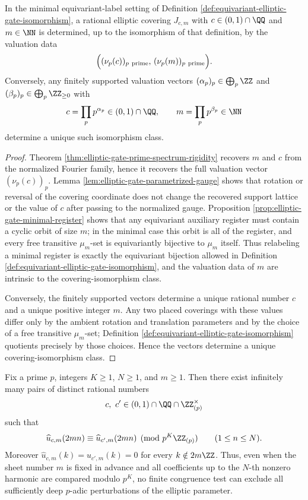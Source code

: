 \begin{corollary}\label{cor:elliptic-gate-prime-spectrum-classification}
In the minimal equivariant-label setting of Definition \ref{def:equivariant-elliptic-gate-isomorphism}, a rational elliptic covering \(J_{c,m}\) with \(c\in(0,1)\cap\QQ\) and \(m\in\NN\) is determined, up to the isomorphism of that definition, by the valuation data
\[
\Bigl((\nu_p(c))_{p\ \mathrm{prime}},\,(\nu_p(m))_{p\ \mathrm{prime}}\Bigr).
\]
Conversely, any finitely supported valuation vectors \((\alpha_p)_p\in\bigoplus_p\ZZ\) and \((\beta_p)_p\in\bigoplus_p\ZZ_{\ge0}\) with
\[
c=\prod_p p^{\alpha_p}\in(0,1)\cap\QQ,
\qquad
m=\prod_p p^{\beta_p}\in\NN
\]
determine a unique such isomorphism class.
\end{corollary}

\begin{proof}
Theorem \ref{thm:elliptic-gate-prime-spectrum-rigidity} recovers \(m\) and \(c\) from the normalized Fourier family, hence it recovers the full valuation vector \((\nu_p(c))_p\). Lemma \ref{lem:elliptic-gate-parametrized-gauge} shows that rotation or reversal of the covering coordinate does not change the recovered support lattice or the value of \(c\) after passing to the normalized gauge. Proposition \ref{prop:elliptic-gate-minimal-register} shows that any equivariant auxiliary register must contain a cyclic orbit of size \(m\); in the minimal case this orbit is all of the register, and every free transitive \(\mu_m\)-set is equivariantly bijective to \(\mu_m\) itself. Thus relabeling a minimal register is exactly the equivariant bijection allowed in Definition \ref{def:equivariant-elliptic-gate-isomorphism}, and the valuation data of \(m\) are intrinsic to the covering-isomorphism class.

Conversely, the finitely supported vectors determine a unique rational number \(c\) and a unique positive integer \(m\). Any two placed coverings with these values differ only by the ambient rotation and translation parameters and by the choice of a free transitive \(\mu_m\)-set; Definition \ref{def:equivariant-elliptic-gate-isomorphism} quotients precisely by those choices. Hence the vectors determine a unique covering-isomorphism class.
\end{proof}

\begin{theorem}\label{thm:elliptic-gate-padics-obstruction}
Fix a prime \(p\), integers \(K\ge 1\), \(N\ge 1\), and \(m\ge 1\). Then there exist infinitely many pairs of distinct rational numbers
\[
c,\ c'\in (0,1)\cap\QQ\cap\ZZ_{(p)}^\times
\]
such that
\[
\widehat u_{c,m}(2mn)\equiv \widehat u_{c',m}(2mn)\pmod{p^K\ZZ_{(p)}}
\qquad (1\le n\le N).
\]
Moreover \(\widehat u_{c,m}(k)=\widehat u_{c',m}(k)=0\) for every \(k\notin 2m\ZZ\). Thus, even when the sheet number \(m\) is fixed in advance and all coefficients up to the \(N\)-th nonzero harmonic are compared modulo \(p^K\), no finite congruence test can exclude all sufficiently deep \(p\)-adic perturbations of the elliptic parameter.
\end{theorem}

